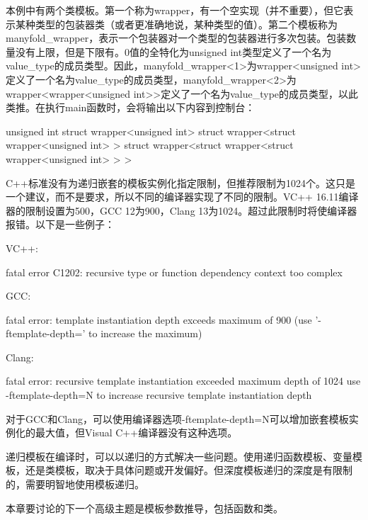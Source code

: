 本例中有两个类模板。第一个称为wrapper，有一个空实现（并不重要），但它表示某种类型的包装器类（或者更准确地说，某种类型的值）。第二个模板称为manyfold\_wrapper，表示一个包装器对一个类型的包装器进行多次包装。包装数量没有上限，但是下限有。0值的全特化为unsigned int类型定义了一个名为value\_type的成员类型。因此，manyfold\_wrapper<1>为wrapper<unsigned int>定义了一个名为value\_type的成员类型，manyfold\_wrapper<2>为wrapper<wrapper<unsigned int>>定义了一个名为value\_type的成员类型，以此类推。在执行main函数时，会将输出以下内容到控制台：

\begin{cpp}
unsigned int
struct wrapper<unsigned int>
struct wrapper<struct wrapper<unsigned int> >
struct wrapper<struct wrapper<struct wrapper<unsigned int> > >
\end{cpp}

C++标准没有为递归嵌套的模板实例化指定限制，但推荐限制为1024个。这只是一个建议，而不是要求，所以不同的编译器实现了不同的限制。VC++ 16.11编译器的限制设置为500，GCC 12为900，Clang 13为1024。超过此限制时将使编译器报错。以下是一些例子：

VC++:

\begin{shell}
fatal error C1202: recursive type or function dependency
context too complex
\end{shell}

GCC:

\begin{shell}
fatal error: template instantiation depth exceeds maximum of
900 (use '-ftemplate-depth=' to increase the maximum)
\end{shell}

Clang:

\begin{shell}
fatal error: recursive template instantiation exceeded maximum
depth of 1024
use -ftemplate-depth=N to increase recursive template
instantiation depth
\end{shell}

对于GCC和Clang，可以使用编译器选项-ftemplate-depth=N可以增加嵌套模板实例化的最大值，但Visual C++编译器没有这种选项。

递归模板在编译时，可以以递归的方式解决一些问题。使用递归函数模板、变量模板，还是类模板，取决于具体问题或开发偏好。但深度模板递归的深度是有限制的，需要明智地使用模板递归。

本章要讨论的下一个高级主题是模板参数推导，包括函数和类。





